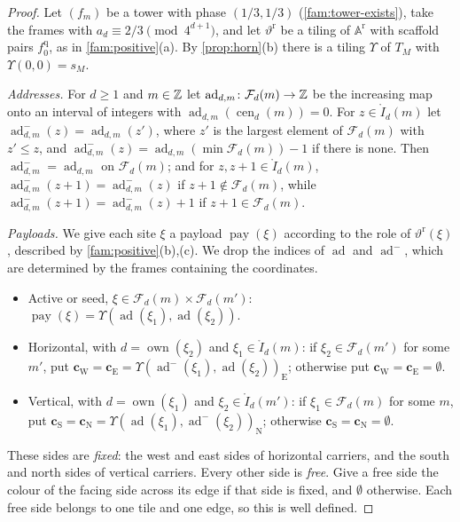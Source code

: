 \begin{proof}
Let $(f_m)$ be a tower with phase $(1/3,1/3)$ (\cref{fam:tower-exists}), take the frames with $a_d\equiv2/3\pmod{4^{d+1}}$, and let $\vartheta^{\mathrm r}$ be a tiling of $\mathbb A^{\mathrm r}$ with scaffold pairs $f_0^{\mathrm q}$, as in \cref{fam:positive}(a). By \cref{prop:horn}(b) there is a tiling $\Upsilon$ of $T_M$ with $\Upsilon(0,0)=s_M$.

\emph{Addresses.} For $d\ge1$ and $m\in\mathbb{Z}$ let $\operatorname{ad}_{d,m}\colon\mathcal F_d(m)\to\mathbb{Z}$ be the increasing map onto an interval of integers with $\operatorname{ad}_{d,m}(\operatorname{cen}_d(m))=0$. For $z\in\mathring I_d(m)$ let $\operatorname{ad}^-_{d,m}(z)=\operatorname{ad}_{d,m}(z')$, where $z'$ is the largest element of $\mathcal F_d(m)$ with $z'\le z$, and $\operatorname{ad}^-_{d,m}(z)=\operatorname{ad}_{d,m}(\min\mathcal F_d(m))-1$ if there is none. Then $\operatorname{ad}^-_{d,m}=\operatorname{ad}_{d,m}$ on $\mathcal F_d(m)$; and for $z,z+1\in\mathring I_d(m)$, $\operatorname{ad}^-_{d,m}(z+1)=\operatorname{ad}^-_{d,m}(z)$ if $z+1\notin\mathcal F_d(m)$, while $\operatorname{ad}^-_{d,m}(z+1)=\operatorname{ad}^-_{d,m}(z)+1$ if $z+1\in\mathcal F_d(m)$.

\emph{Payloads.} We give each site $\xi$ a payload $\operatorname{pay}(\xi)$ according to the role of $\vartheta^{\mathrm r}(\xi)$, described by \cref{fam:positive}(b),(c). We drop the indices of $\operatorname{ad}$ and $\operatorname{ad}^-$, which are determined by the frames containing the coordinates.
\begin{itemize}
\item Active or seed, $\xi\in\mathcal F_d(m)\times\mathcal F_d(m')$: $\operatorname{pay}(\xi)=\Upsilon(\operatorname{ad}(\xi_1),\operatorname{ad}(\xi_2))$.
\item Horizontal, with $d=\operatorname{own}(\xi_2)$ and $\xi_1\in\mathring I_d(m)$: if $\xi_2\in\mathcal F_d(m')$ for some $m'$, put $\mathbf c_{\mathrm W}=\mathbf c_{\mathrm E}=\Upsilon(\operatorname{ad}^-(\xi_1),\operatorname{ad}(\xi_2))_{\mathrm E}$; otherwise put $\mathbf c_{\mathrm W}=\mathbf c_{\mathrm E}=\emptyset$.
\item Vertical, with $d=\operatorname{own}(\xi_1)$ and $\xi_2\in\mathring I_d(m')$: if $\xi_1\in\mathcal F_d(m)$ for some $m$, put $\mathbf c_{\mathrm S}=\mathbf c_{\mathrm N}=\Upsilon(\operatorname{ad}(\xi_1),\operatorname{ad}^-(\xi_2))_{\mathrm N}$; otherwise $\mathbf c_{\mathrm S}=\mathbf c_{\mathrm N}=\emptyset$.
\end{itemize}
These sides are \emph{fixed}: the west and east sides of horizontal carriers, and the south and north sides of vertical carriers. Every other side is \emph{free}. Give a free side the colour of the facing side across its edge if that side is fixed, and $\emptyset$ otherwise. Each free side belongs to one tile and one edge, so this is well defined.


\end{proof}
